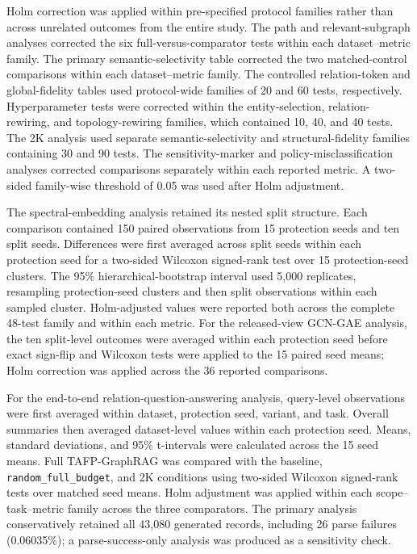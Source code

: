 \documentclass[preprint,12pt]{elsarticle}
\begin{document}
Holm correction was applied within pre-specified protocol families rather than across unrelated outcomes from the entire study. The path and relevant-subgraph analyses corrected the six full-versus-comparator tests within each dataset--metric family. The primary semantic-selectivity table corrected the two matched-control comparisons within each dataset--metric family. The controlled relation-token and global-fidelity tables used protocol-wide families of 20 and 60 tests, respectively. Hyperparameter tests were corrected within the entity-selection, relation-rewiring, and topology-rewiring families, which contained 10, 40, and 40 tests. The 2K analysis used separate semantic-selectivity and structural-fidelity families containing 30 and 90 tests. The sensitivity-marker and policy-misclassification analyses corrected comparisons separately within each reported metric. A two-sided family-wise threshold of 0.05 was used after Holm adjustment.

The spectral-embedding analysis retained its nested split structure. Each comparison contained 150 paired observations from 15 protection seeds and ten split seeds. Differences were first averaged across split seeds within each protection seed for a two-sided Wilcoxon signed-rank test over 15 protection-seed clusters. The 95\% hierarchical-bootstrap interval used 5,000 replicates, resampling protection-seed clusters and then split observations within each sampled cluster. Holm-adjusted values were reported both across the complete 48-test family and within each metric. For the released-view GCN-GAE analysis, the ten split-level outcomes were averaged within each protection seed before exact sign-flip and Wilcoxon tests were applied to the 15 paired seed means; Holm correction was applied across the 36 reported comparisons.

For the end-to-end relation-question-answering analysis, query-level observations were first averaged within dataset, protection seed, variant, and task. Overall summaries then averaged dataset-level values within each protection seed. Means, standard deviations, and 95\% t-intervals were calculated across the 15 seed means. Full TAFP-GraphRAG was compared with the baseline, \nolinkurl{random_full_budget}, and 2K conditions using two-sided Wilcoxon signed-rank tests over matched seed means. Holm adjustment was applied within each scope--task--metric family across the three comparators. The primary analysis conservatively retained all 43,080 generated records, including 26 parse failures (0.06035\%); a parse-success-only analysis was produced as a sensitivity check.
\end{document}
